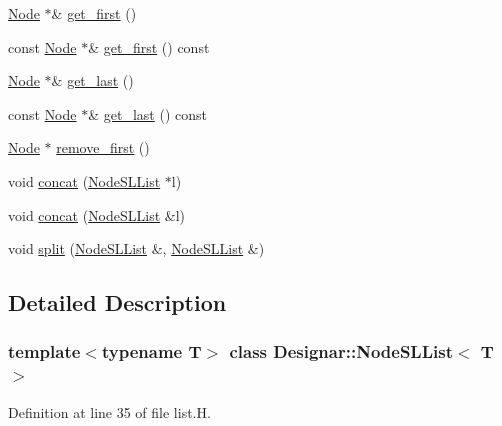\begin{DoxyCompactItemize}
\hyperlink{class_designar_1_1_node_s_l_list_a41963019ada1025099e3259207a3de96}{Node} $\ast$\& \hyperlink{class_designar_1_1_node_s_l_list_af776e7d8dba9e4a250df74b6eac36658}{get\+\_\+first} ()
\item 
const \hyperlink{class_designar_1_1_node_s_l_list_a41963019ada1025099e3259207a3de96}{Node} $\ast$\& \hyperlink{class_designar_1_1_node_s_l_list_a1644a837ab4aac745c809b021fc21dfc}{get\+\_\+first} () const
\item 
\hyperlink{class_designar_1_1_node_s_l_list_a41963019ada1025099e3259207a3de96}{Node} $\ast$\& \hyperlink{class_designar_1_1_node_s_l_list_a1c42a40b92315cd21a81c1ae74b65636}{get\+\_\+last} ()
\item 
const \hyperlink{class_designar_1_1_node_s_l_list_a41963019ada1025099e3259207a3de96}{Node} $\ast$\& \hyperlink{class_designar_1_1_node_s_l_list_acce6901e0e50d718aeff268506b6f2f1}{get\+\_\+last} () const
\item 
\hyperlink{class_designar_1_1_node_s_l_list_a41963019ada1025099e3259207a3de96}{Node} $\ast$ \hyperlink{class_designar_1_1_node_s_l_list_a37a8279d8a5dafa5239375b2a3d12b32}{remove\+\_\+first} ()
\item 
void \hyperlink{class_designar_1_1_node_s_l_list_a0400606ec383f95bf2b0e1f5c378538e}{concat} (\hyperlink{class_designar_1_1_node_s_l_list}{Node\+S\+L\+List} $\ast$l)
\item 
void \hyperlink{class_designar_1_1_node_s_l_list_af38f38977f2e947500f8e627c8888c66}{concat} (\hyperlink{class_designar_1_1_node_s_l_list}{Node\+S\+L\+List} \&l)
\item 
void \hyperlink{class_designar_1_1_node_s_l_list_a4ec48a3001dd5a0f997b09f05ed4d6e6}{split} (\hyperlink{class_designar_1_1_node_s_l_list}{Node\+S\+L\+List} \&, \hyperlink{class_designar_1_1_node_s_l_list}{Node\+S\+L\+List} \&)
\end{DoxyCompactItemize}


\subsection{Detailed Description}
\subsubsection*{template$<$typename T$>$\newline
class Designar\+::\+Node\+S\+L\+List$<$ T $>$}



Definition at line 35 of file list.\+H.



